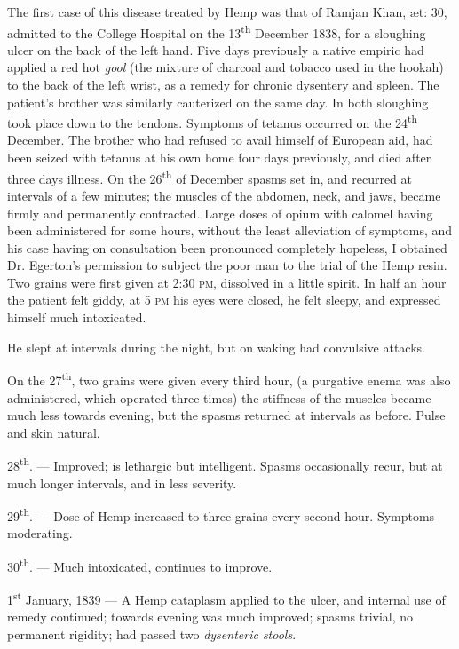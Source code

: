 \documentclass[a4paper, 11pt, oneside, polutonikogreek, english]{article}
\begin{document}
The first case of this disease treated by Hemp was that of Ramjan Khan, æt: 30, admitted to the College Hospital on the 13\textsuperscript{th} December 1838, for a sloughing ulcer on the back of the left hand. Five days previously a native empiric had applied a red hot \emph{gool} (the mixture of charcoal and tobacco used in the hookah) to the back of the left wrist, as a remedy for chronic dysentery and spleen. The patient's brother was similarly cauterized on the same day. In both sloughing took place down to the tendons. Symptoms of tetanus occurred on the 24\textsuperscript{th} December. The brother who had refused to avail himself of European aid, had been seized with tetanus at his own home four days previously, and died after three days illness. On the 26\textsuperscript{th} of December spasms set in, and recurred at intervals of a few minutes; the muscles of the abdomen, neck, and jaws, became firmly and permanently contracted. Large doses of opium with calomel having been administered for some hours, without the least alleviation of symptoms, and his case having on consultation been pronounced completely hopeless, I obtained Dr. Egerton's permission to subject the poor man to the trial of the Hemp resin. Two grains were first given at 2:30 \textsc{pm}, dissolved in a little spirit. In half an hour the patient felt giddy, at 5 \textsc{pm} his eyes were closed, he felt sleepy, and expressed himself much intoxicated.

He slept at intervals during the night, but on waking had convulsive attacks.

On the 27\textsuperscript{th}, two grains were given every third hour, (a purgative enema was also administered, which operated three times) the stiffness of the muscles became much less towards evening, but the spasms returned at intervals as before. Pulse and skin natural.

28\textsuperscript{th}. --- Improved; is lethargic but intelligent. Spasms occasionally recur, but at much longer intervals, and in less severity.

29\textsuperscript{th}. --- Dose of Hemp increased to three grains every second hour. Symptoms moderating.

30\textsuperscript{th}. --- Much intoxicated, continues to improve.

1\textsuperscript{st} January, 1839 --- A Hemp cataplasm applied to the ulcer, and internal use of remedy continued; towards evening was much improved; spasms trivial, no permanent rigidity; had passed two \emph{dysenteric stools}.
\end{document}
